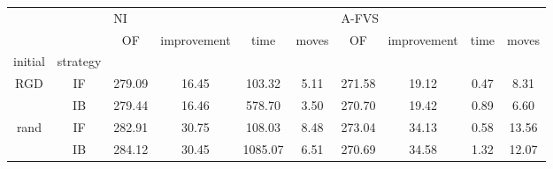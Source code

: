 \begin{tabular}{cccccccccc}
\toprule
     &    & \multicolumn{4}{l}{NI} & \multicolumn{4}{l}{A-FVS} \\
     &    &     OF & improvement &    time & moves &     OF & improvement & time & moves \\
initial & strategy &        &             &         &       &        &             &      &       \\
\midrule
\multirow{2}{*}{RGD} & IF & 279.09 &       16.45 &  103.32 &  5.11 & 271.58 &       19.12 & 0.47 &  8.31 \\
     & IB & 279.44 &       16.46 &  578.70 &  3.50 & 270.70 &       19.42 & 0.89 &  6.60 \\
\cline{1-10}
\multirow{2}{*}{rand} & IF & 282.91 &       30.75 &  108.03 &  8.48 & 273.04 &       34.13 & 0.58 & 13.56 \\
     & IB & 284.12 &       30.45 & 1085.07 &  6.51 & 270.69 &       34.58 & 1.32 & 12.07 \\
\bottomrule
\end{tabular}
